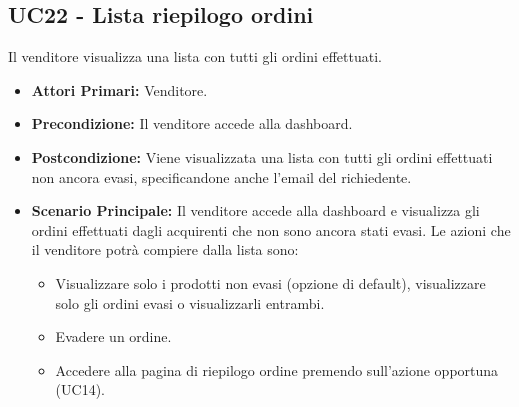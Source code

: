 \subsection{UC22 - Lista riepilogo ordini}
\label{UC22}
Il venditore visualizza una lista con tutti gli ordini effettuati.
\begin{itemize}
    \item \textbf{Attori Primari:} Venditore.
    \item \textbf{Precondizione:} Il venditore accede alla dashboard.
    \item \textbf{Postcondizione:} Viene visualizzata una lista con tutti gli ordini effettuati non ancora evasi, specificandone anche l'email del richiedente.
    \item \textbf{Scenario Principale:} Il venditore accede alla dashboard e visualizza gli ordini effettuati dagli acquirenti che non sono ancora stati evasi. Le azioni che il venditore potrà compiere dalla lista sono: 
    \begin{itemize}
        \item Visualizzare solo i prodotti non evasi (opzione di default), visualizzare solo gli ordini evasi o visualizzarli entrambi.
        \item Evadere un ordine.
        \item Accedere alla pagina di riepilogo ordine premendo sull'azione opportuna (UC14).
    \end{itemize}
\end{itemize}
